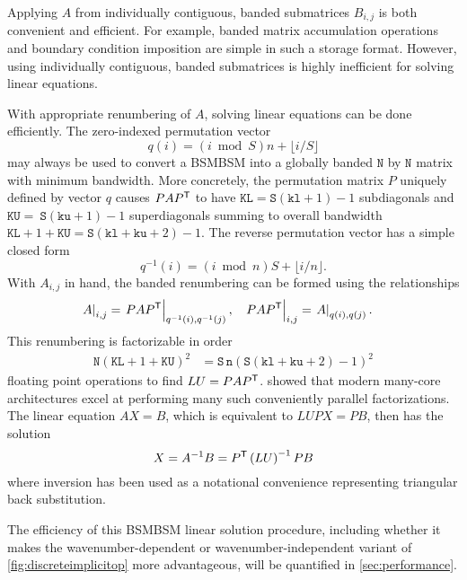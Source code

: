 Applying $A$ from individually contiguous, banded submatrices $B_{i,j}$
is both convenient and efficient.  For example, banded matrix accumulation
operations and boundary condition imposition are simple in such a storage
format.  However, using individually contiguous, banded submatrices is highly
inefficient for solving linear equations.

With appropriate renumbering of $A$, solving linear equations can be done
efficiently.  The zero-indexed permutation vector \[q(i) =
\left(i\bmod{}S\right)n + \lfloor{}i/S\rfloor{}\] may always be used to convert
a BSMBSM into a globally banded $\mathtt{N}$ by $\mathtt{N}$ matrix with
minimum bandwidth.  More concretely, the permutation matrix $P$ uniquely
defined by vector $q$ causes $P A {P}^{\mathsf{T}}$ to have $\mathtt{KL} =
\mathtt{S}\left(\mathtt{kl}+1\right)-1$ subdiagonals and
$\mathtt{KU}=~\mathtt{S}\left(\mathtt{ku}+1\right)-1$ superdiagonals summing to
overall bandwidth $\mathtt{KL} + 1 + \mathtt{KU} = \mathtt{S}\left(\mathtt{kl}
+ \mathtt{ku} + 2\right)-1$.  The reverse permutation vector has a simple
closed form \[q^{-1}(i) = \left(i\bmod{}n\right)S + \lfloor{}i/n\rfloor{}.\]
With $A_{i,j}$ in hand, the banded renumbering can be formed using the
relationships
\begin{align}
\label{eq:bsmbsm_renumbering}
       \left.A\right|_{i,j}
    &= \left.P A {P}^{\mathsf{T}}\right|_{q^{-1}(i),q^{-1}(j)},
    &
       \left.P A {P}^{\mathsf{T}}\right|_{i,j}
    &= \left.A\right|_{q(i),q(j)}.
\end{align}
This renumbering is factorizable in order
\begin{align}
    \label{eq:bsmbsm_factorization}
       \mathtt{N}\left(\mathtt{KL} + 1 + \mathtt{KU}\right)^2
    &= \mathtt{S}\,\mathtt{n}\left(
            \mathtt{S}\left(\mathtt{kl} + \mathtt{ku} + 2\right)-1
       \right)^2
\end{align}
floating point operations to find $LU = P A
{P}^{\mathsf{T}}$.  \citet{Schulz2012Early} showed that modern many-core
architectures excel at performing many such conveniently
parallel factorizations.  The linear equation $AX=B$, which is
equivalent to $LUPX=PB$, then has the solution \[X = A^{-1}B =
{P}^{\mathsf{T}}\left(LU\right)^{-1}PB\] where inversion has been used as a
notational convenience representing triangular back substitution.

The efficiency of this BSMBSM linear solution procedure, including whether it
makes the wavenumber-dependent or wavenumber-independent variant of
\autoref{fig:discreteimplicitop} more advantageous, will be quantified in
\autoref{sec:performance}.


